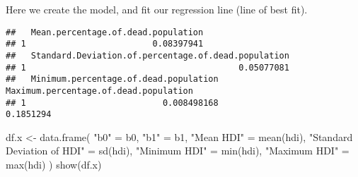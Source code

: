 \documentclass[
  12pt,
]{article}
\newenvironment{Shaded}{\begin{snugshade}}{\end{snugshade}}
\newcommand{\DecValTok}[1]{\textcolor[rgb]{0.00,0.00,0.81}{#1}}
\newcommand{\FunctionTok}[1]{\textcolor[rgb]{0.00,0.00,0.00}{#1}}
\newcommand{\NormalTok}[1]{#1}
\newcommand{\OtherTok}[1]{\textcolor[rgb]{0.56,0.35,0.01}{#1}}
\newcommand{\SpecialCharTok}[1]{\textcolor[rgb]{0.00,0.00,0.00}{#1}}
\newcommand{\StringTok}[1]{\textcolor[rgb]{0.31,0.60,0.02}{#1}}
\begin{document}
Here we create the model, and fit our regression line (line of best
fit).

\begin{Shaded}
\end{Shaded}

\begin{verbatim}
##   Mean.percentage.of.dead.population
## 1                         0.08397941
##   Standard.Deviation.of.percentage.of.dead.population
## 1                                          0.05077081
##   Minimum.percentage.of.dead.population Maximum.percentage.of.dead.population
## 1                           0.008498168                             0.1851294
\end{verbatim}

\begin{Shaded}
\begin{Highlighting}[]
\NormalTok{df.x }\OtherTok{\textless{}{-}} \FunctionTok{data.frame}\NormalTok{(}
  \StringTok{"b0"} \OtherTok{=}\NormalTok{ b0,}
  \StringTok{"b1"} \OtherTok{=}\NormalTok{ b1,}
  \StringTok{"Mean HDI"} \OtherTok{=} \FunctionTok{mean}\NormalTok{(hdi),}
  \StringTok{"Standard Deviation of HDI"} \OtherTok{=} \FunctionTok{sd}\NormalTok{(hdi),}
  \StringTok{"Minimum HDI"} \OtherTok{=} \FunctionTok{min}\NormalTok{(hdi),}
  \StringTok{"Maximum HDI"} \OtherTok{=} \FunctionTok{max}\NormalTok{(hdi)}
\NormalTok{)}
\FunctionTok{show}\NormalTok{(df.x)}
\end{Highlighting}
\end{Shaded}
\end{document}
